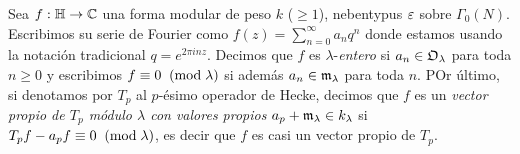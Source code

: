 \documentclass[../../tesis_maestria]{subfiles}
\begin{document}
Sea $f:\mathbb{H}\rightarrow\mathbb{C}$ una forma modular de peso $k$ ($\geq 1$), nebentypus $\varepsilon$ sobre $\Gamma_0(N)$.
Escribimos su serie de Fourier como $f(z)=\sum_{n=0}^{\infty}a_nq^n$ donde estamos usando la notaci\'on
tradicional $q=e^{2\pi inz}$. Decimos que $f$ es $\lambda$-\emph{entero} si $a_n\in\mathfrak{O}_{\lambda}$ para
toda $n\geq0$ y escribimos $f\equiv 0\;\;(\mathrm{mod}\; \lambda)$ si adem\'as $a_n\in\mathfrak{m}_{\lambda}$ para toda
$n$. POr \'ultimo, si denotamos por $T_p$ al $p$-\'esimo operador de Hecke, decimos que $f$ es un
\emph{vector propio de $T_p$ m\'odulo $\lambda$ con valores propios $a_p+\mathfrak{m}_{\lambda}\in k_{\lambda}$}
si $T_pf-a_pf\equiv 0\;\;(\mathrm{mod}\; \lambda)$, es decir que $f$ es casi un vector propio de $T_p$.
\begin{comment}
\begin{thm}\label{thm:DS}%
  Con la notaci\'on anterior, sea $f\in M_{k}(\Gamma_0(N),\eps)$ con $k\geq1$ cuyos coeficientes
  de Fourier pertenecen a $K$. Adem\'as supongamos que $f$ es $\lambda$-entero,
  $f\not\equiv0\Mod{\lambda}$ y que $f$ es un vector propio de $T_p$ m\'odulo $\lambda$ para toda
  $p\nmid Nl$ con valores propios $a_p+\m_{\lambda}\in k_{\lambda}$. Sea $k_f\subseteq k_{\lambda}$
  el subcampo generado por todas las $a_p+\m_{\lambda}$ y los $\eps(p)+\m_{\lambda}$ donde
  $p\nmid Nl$. Entonces existe una representaci\'on semisimple $\rho:G_{\QQ}\ra\GL_2(k_f)$ que
  cumple las siguientes propiedades:
  \begin{enumerate}[label=\emph{\roman*})]
  \item $\rho$ es no-ramificada para toda $p\nmid Nl$.
  \item $\tr(\rho(\frob)_p)=a_p+\m_{\lambda}$ para toda $p\nmid Nl$.
  \item $\det(\rho(\frob)_p)=\eps(p)p^{k-1}+\m_{\lambda}$ para toda $p\nmid Nl$.
  \end{enumerate}
\end{thm}%

Antes de empezar la prueba, vamos a hacer tres reducciones preliminares:


\end{comment}
\end{document}
